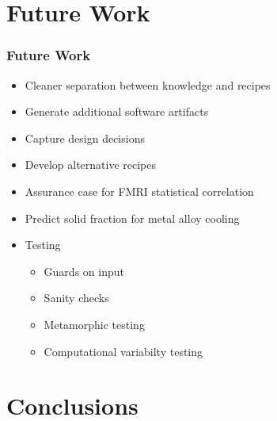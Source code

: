 \documentclass{beamer}
\begin{document}
\hoffset=0in %


\section[Future Work]{Future Work}


\begin{frame}

\frametitle{Future Work}

\begin{itemize}
\item Cleaner separation between knowledge and recipes
\item Generate additional software artifacts
\item Capture design decisions
\item Develop alternative recipes
\item Assurance case for FMRI statistical correlation
\item Predict solid fraction for metal alloy cooling
\item Testing
\begin{itemize}
\item Guards on input
\item Sanity checks
\item Metamorphic testing
\item Computational variabilty testing
\end{itemize}
\end{itemize}

\end{frame}


\section[Conclusions]{Conclusions}

\end{document}
